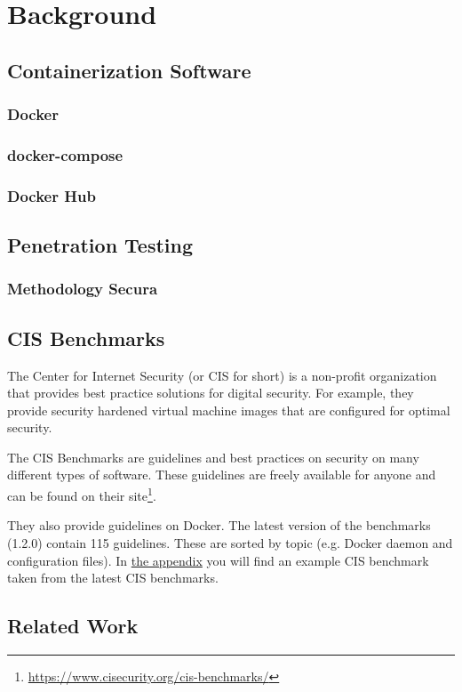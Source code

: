 \chapter{Background}

\section{Containerization Software}
\subsection{Docker}
\subsection{docker-compose}
\subsection{Docker Hub}

\section{Penetration Testing}
\subsection{Methodology Secura}

\section{CIS Benchmarks}
The Center for Internet Security (or CIS for short) is a non-profit organization that provides best practice solutions for digital security. For example, they provide security hardened virtual machine images that are configured for optimal security.

\hfill

The CIS Benchmarks are guidelines and best practices on security on many different types of software. These guidelines are freely available for anyone and can be found on their site\footnote{\url{https://www.cisecurity.org/cis-benchmarks/}}.

\hfill

They also provide guidelines on Docker\cite{cis}. The latest version of the benchmarks (1.2.0) contain 115 guidelines. These are sorted by topic (e.g. Docker daemon and configuration files). In \hyperref[appendix:a]{the appendix} you will find an example CIS benchmark taken from the latest CIS benchmarks.

\section{Related Work}
